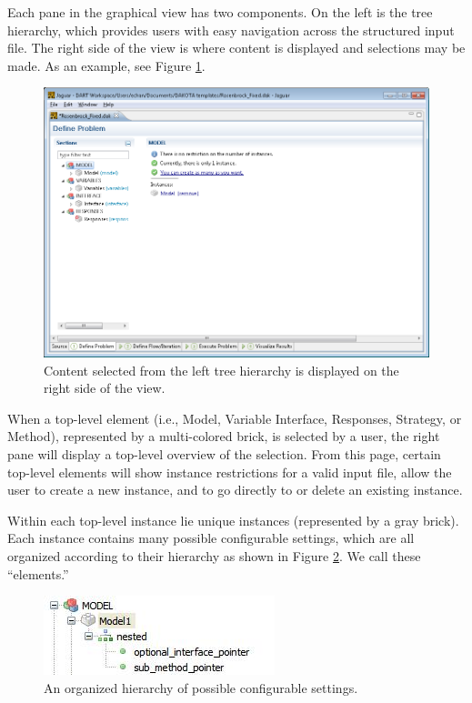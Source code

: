 Each pane in the graphical view has two components.  On the left is
the tree hierarchy, which provides users with easy navigation across
the structured input file.  The right side of the view is where
content is displayed and selections may be made.  As an example, see
Figure \ref{fig:input:jag_graphical2}.
\begin{figure}
  \centering
  \includegraphics[scale=0.4]{images/2_1jag_graphical2}
  \caption{Content selected from the left tree hierarchy is displayed
    on the right side of the view.}
  \label{fig:input:jag_graphical2}
\end{figure}

When a top-level element (i.e., Model, Variable Interface, Responses,
Strategy, or Method), represented by a multi-colored brick, is
selected by a user, the right pane will display a top-level overview
of the selection.  From this page, certain top-level elements will
show instance restrictions for a valid input file, allow the user to
create a new instance, and to go directly to or delete an existing
instance.

Within each top-level instance lie unique instances (represented by a
gray brick).  Each instance contains many possible configurable
settings, which are all organized according to their hierarchy as
shown in Figure \ref{fig:input:jag_graphical3}.  We call these
``elements.''
\begin{figure}
  \centering
  \includegraphics[scale=0.8]{images/jag_graphical3}
  \caption{An organized hierarchy of possible configurable settings.}
  \label{fig:input:jag_graphical3}
\end{figure}

